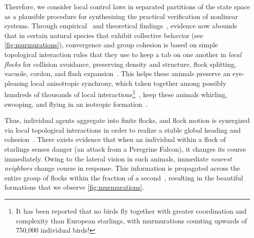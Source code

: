 
%
Therefore, we consider local control laws in separated partitions of the state space as a plausible procedure for synthesizing the practical verification of nonlinear systems. Through empirical~\cite{Ballerini1232, Helbing20, VicsekPhaseNovel} %
and theoretical findings~\cite{JadbabaieCoord}, evidence now abounds that in certain natural species that exhibit collective behavior (see \autoref{fig:murmurations}), convergence and group cohesion is based on simple topological interaction rules that they use to keep a tab on one another in \textit{local flocks} for collision avoidance, preserving density and structure, flock splitting, vacuole, cordon, and flash expansion~\cite{NatGeo}. This helps these animals preserve an eye-pleasing local anisotropic synchrony, which taken together among possibly hundreds of thousands of local interactions\footnote{It has been reported that no birds fly together with greater coordination and complexity than European starlings,  with murmurations counting upwards of 750,000 individual birds!}~\cite{NatGeo}, keep these animals whirling, swooping, and flying in an isotropic formation~\cite{Ballerini1232}. 

Thus, individual agents aggregate into finite flocks, and flock motion is synergized via local topological interactions in order to realize a stable global heading and cohesion~\cite{JadbabaieCoord}. There exists evidence that when an individual within a flock of starlings senses danger (\eg an attack from a Peregrine Falcon), it changes its course immediately. Owing to the lateral vision in such animals, immediate \textit{nearest neighbors} change course in response. This information is propagated across the entire group of flocks within the fraction of a second~\cite{Ballerini1232}, resulting in the beautiful formations that we observe \cf \autoref{fig:murmurations}. 

